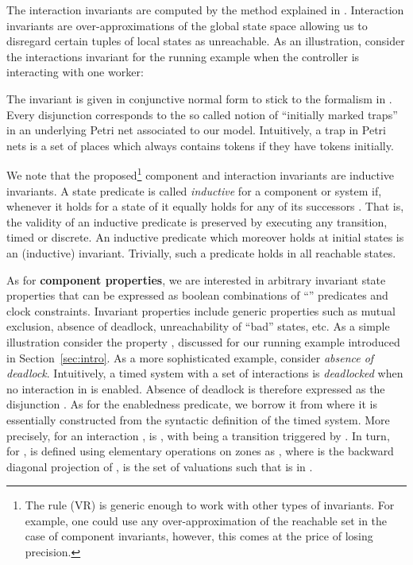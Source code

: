 \documentclass{LMCS}
\newcommand{\vr}{(VR)}
\theoremstyle{plain}\newtheorem{remark}[thm]{Remark}
\theoremstyle{plain}\newtheorem{example}[thm]{Example}
\begin{document}
The interaction invariants are computed by the method explained in
\cite{dfinder}. Interaction invariants are over-approximations of the
global state space allowing us to disregard certain tuples of local
states as unreachable. As an illustration, consider the interactions
invariant for the running example when the controller is interacting
with one worker:

The invariant is given in conjunctive normal form to stick to the
formalism in \cite{dfinder, dfinderJ}. Every disjunction corresponds
to the so called notion of ``initially marked traps'' in an underlying
Petri net associated to our model. Intuitively, a trap in Petri nets
is a set of places which always contains tokens if they have tokens
initially.

We note that the proposed\footnote{The rule \vr\; is generic enough to
  work with other types of invariants. For example, one could use any
  over-approximation of the reachable set in the case of component
  invariants, however, this comes at the price of losing precision.}
component and interaction invariants are inductive invariants.  A
state predicate is called {\em inductive} for a component or system
 if, whenever it holds for a state  of  it equally holds for
any of its successors .  That is, the validity of an inductive
predicate is preserved by executing any transition, timed or discrete.
An inductive predicate which moreover holds at initial states is an
(inductive) invariant.  Trivially, such a predicate holds in all
reachable states.

As for \textbf{component properties}, we are interested in arbitrary
invariant state properties that can be expressed as boolean
combinations of ``'' predicates and clock constraints.
Invariant properties include generic properties such as mutual
exclusion, absence of deadlock, unreachability of ``bad'' states, etc.
As a simple illustration consider the property , discussed for our running example
introduced in Section~\ref{sec:intro}.  As a more sophisticated
example, consider \textit{absence of deadlock}.  Intuitively, a timed
system with a set of interactions  is \textit{deadlocked} when
no interaction in  is enabled.  Absence of deadlock is
therefore expressed as the disjunction . As for the enabledness predicate, we borrow it from
\cite{tripakis99:progress} where it is essentially constructed from
the syntactic definition of the timed system. More precisely, for an
interaction ,  is , with  being
a transition triggered by .  In turn, for ,  is defined using elementary
operations on zones as , where  is the
backward diagonal projection of ,  is the set of
valuations  such that  is in .
\end{document}
